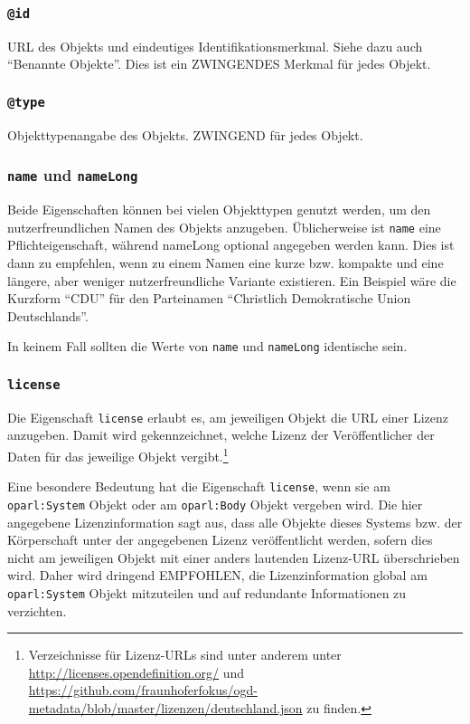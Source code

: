 \documentclass[,a4paper]{article}
\begin{document}
\subsubsection{\texttt{@id}}\label{id}

URL des Objekts und eindeutiges Identifikationsmerkmal. Siehe dazu auch
``Benannte Objekte''. Dies ist ein ZWINGENDES Merkmal für jedes Objekt.

\subsubsection{\texttt{@type}}\label{type}

Objekttypenangabe des Objekts. ZWINGEND für jedes Objekt.

\subsubsection{\texttt{name} und
\texttt{nameLong}}\label{name-und-namelong}

Beide Eigenschaften können bei vielen Objekttypen genutzt werden, um den
nutzerfreundlichen Namen des Objekts anzugeben. Üblicherweise ist
\texttt{name} eine Pflichteigenschaft, während nameLong optional
angegeben werden kann. Dies ist dann zu empfehlen, wenn zu einem Namen
eine kurze bzw. kompakte und eine längere, aber weniger
nutzerfreundliche Variante existieren. Ein Beispiel wäre die Kurzform
``CDU'' für den Parteinamen ``Christlich Demokratische Union
Deutschlands''.

In keinem Fall sollten die Werte von \texttt{name} und \texttt{nameLong}
identische sein.

\subsubsection{\texttt{license}}\label{license}

Die Eigenschaft \texttt{license} erlaubt es, am jeweiligen Objekt die
URL einer Lizenz anzugeben. Damit wird gekennzeichnet, welche Lizenz der
Veröffentlicher der Daten für das jeweilige Objekt vergibt.\footnote{Verzeichnisse
  für Lizenz-URLs sind unter anderem unter
  \url{http://licenses.opendefinition.org/} und
  \url{https://github.com/fraunhoferfokus/ogd-metadata/blob/master/lizenzen/deutschland.json}
  zu finden.}

Eine besondere Bedeutung hat die Eigenschaft \texttt{license}, wenn sie
am \texttt{oparl:System} Objekt oder am \texttt{oparl:Body} Objekt
vergeben wird. Die hier angegebene Lizenzinformation sagt aus, dass alle
Objekte dieses Systems bzw. der Körperschaft unter der angegebenen
Lizenz veröffentlicht werden, sofern dies nicht am jeweiligen Objekt mit
einer anders lautenden Lizenz-URL überschrieben wird. Daher wird
dringend EMPFOHLEN, die Lizenzinformation global am
\texttt{oparl:System} Objekt mitzuteilen und auf redundante
Informationen zu verzichten.
\end{document}
